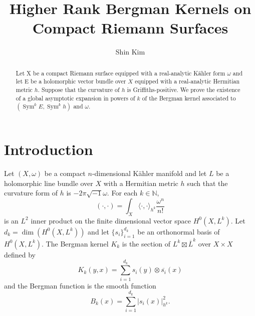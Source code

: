 \documentclass{amsart}
\title{Higher Rank Bergman Kernels on Compact Riemann Surfaces}
\theoremstyle{definition}
\theoremstyle{remark}
\numberwithin{equation}{section}
\DeclareMathOperator{\Sym}{Sym}
\begin{document}
\begin{abstract}
    Let X be a compact Riemann surface equipped with a real-analytic K\"ahler form $\omega$ and let E be a holomorphic vector bundle over $X$ equipped with a real-analytic Hermitian metric $h$. Suppose that the curvature of $h$ is Griffiths-positive. We prove the existence of a global asymptotic expansion in powers of $k$ of the Bergman kernel associated to $(\Sym^k E, \Sym^k h)$ and $\omega$. 
\end{abstract}


\author{Shin Kim}
\address{Department of Mathematics, Statistics, and Computer Science, University of Illinois Chicago, 
Chicago, IL 60607}




\maketitle


\tableofcontents





\section{Introduction}

Let $(X,\omega)$ be a compact $n$-dimensional K\"ahler manifold and let $L$ be a holomorphic line bundle over $X$ with a Hermitian metric $h$ such that the curvature form of $h$ is $-2\pi \sqrt{-1} \omega$. For each $k \in \mathbb{N}$,
\begin{equation*}
( \cdot, \cdot ) = \int_X \langle \cdot, \cdot \rangle_{h^k} \frac{\omega^n}{n!}
\end{equation*}
is an $L^2$ inner product on the finite dimensional vector space $H^0(X,L^k)$. Let $d_k = \dim (H^0(X,L^k))$ and let $\{s_i\}_{i=1}^{d_k}$ be an orthonormal basis of $H^0(X,L^k)$. The Bergman kernel $K_k$ is the section of $L^k \boxtimes \overline{L}^k$ over $X \times X$ defined by
\begin{equation*}
    K_k(y,x) = \sum_{i=1}^{d_k} s_i(y) \otimes \overline{s_i}(x)
\end{equation*}
and the Bergman function is the smooth function
\begin{equation*}
    B_k(x) = \sum_{i=1}^{d_k} |s_i(x)|_{h^k}^2.
\end{equation*}
\end{document}

